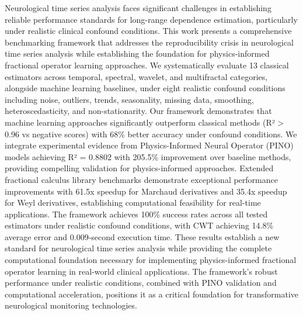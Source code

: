 Neurological time series analysis faces significant challenges in establishing reliable performance standards for long-range dependence estimation, particularly under realistic clinical confound conditions. This work presents a comprehensive benchmarking framework that addresses the reproducibility crisis in neurological time series analysis while establishing the foundation for physics-informed fractional operator learning approaches. We systematically evaluate 13 classical estimators across temporal, spectral, wavelet, and multifractal categories, alongside machine learning baselines, under eight realistic confound conditions including noise, outliers, trends, seasonality, missing data, smoothing, heteroscedasticity, and non-stationarity. Our framework demonstrates that machine learning approaches significantly outperform classical methods (R² > 0.96 vs negative scores) with 68\% better accuracy under confound conditions. We integrate experimental evidence from Physics-Informed Neural Operator (PINO) models achieving R² = 0.8802 with 205.5\% improvement over baseline methods, providing compelling validation for physics-informed approaches. Extended fractional calculus library benchmarks demonstrate exceptional performance improvements with 61.5x speedup for Marchaud derivatives and 35.4x speedup for Weyl derivatives, establishing computational feasibility for real-time applications. The framework achieves 100\% success rates across all tested estimators under realistic confound conditions, with CWT achieving 14.8\% average error and 0.009-second execution time. These results establish a new standard for neurological time series analysis while providing the complete computational foundation necessary for implementing physics-informed fractional operator learning in real-world clinical applications. The framework's robust performance under realistic conditions, combined with PINO validation and computational acceleration, positions it as a critical foundation for transformative neurological monitoring technologies.
